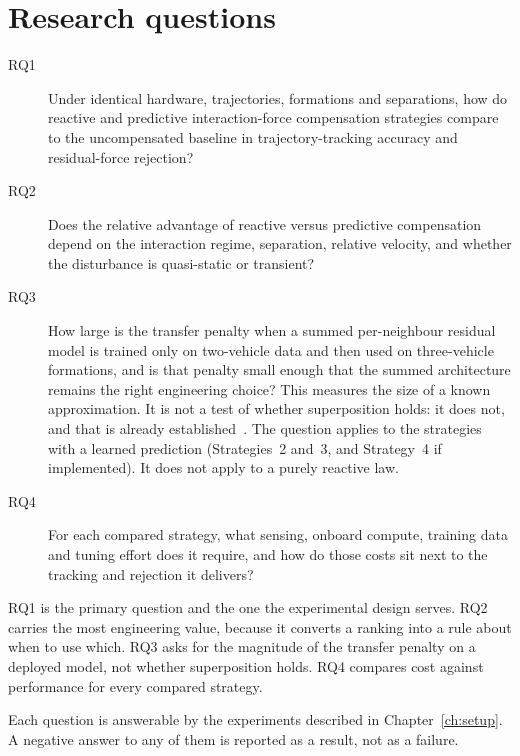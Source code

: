 \section{Research questions}
\label{sec:intro-rq}

\begin{description}
  \item[RQ1] Under identical hardware, trajectories, formations and separations, how do reactive
    and predictive interaction-force compensation strategies compare to the uncompensated baseline
    in trajectory-tracking accuracy and residual-force rejection?

  \item[RQ2] Does the relative advantage of reactive versus predictive compensation depend on the
    interaction regime, separation, relative velocity, and whether the disturbance is
    quasi-static or transient?

  \item[RQ3] How large is the transfer penalty when a summed per-neighbour residual model is
    trained only on two-vehicle data and then used on three-vehicle formations, and is that penalty
    small enough that the summed architecture remains the right engineering choice? This measures
    the size of a known approximation. It is not a test of whether superposition holds: it does
    not, and that is already established~\cite{shi2020neuralswarm,gielis2023aggregate}. The question
    applies to the strategies with a learned prediction (Strategies~2 and~3, and Strategy~4 if
    implemented). It does not apply to a purely reactive law.

  \item[RQ4] For each compared strategy, what sensing, onboard compute, training data and tuning
    effort does it require, and how do those costs sit next to the tracking and rejection it
    delivers?
\end{description}

RQ1 is the primary question and the one the experimental design serves. RQ2 carries the most
engineering value, because it converts a ranking into a rule about when to use which. RQ3 asks for
the magnitude of the transfer penalty on a deployed model, not whether superposition holds.
RQ4 compares cost against performance for every compared strategy.

Each question is answerable by the experiments described in Chapter~\ref{ch:setup}. A negative
answer to any of them is reported as a result, not as a failure.

